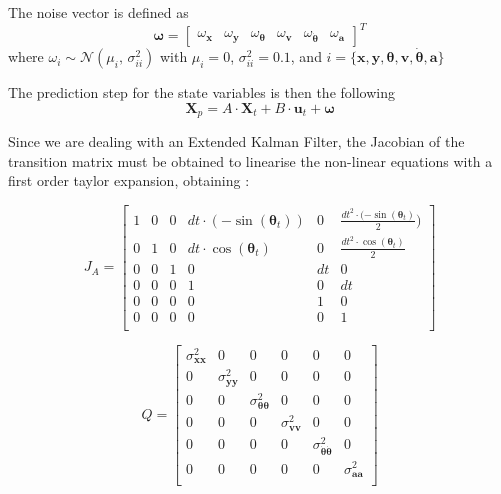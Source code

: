 The noise vector is defined as
\begin{equation}
\boldsymbol \omega
=
\begin{bmatrix} 
\omega_{\mathbf{x}}  & 
\omega_{\mathbf{y}} &
\omega_{\boldsymbol \theta}  & 
\omega_{\mathbf{v}} & 
\omega_{\dot{\boldsymbol \theta}} &
\omega_{\mathbf{a}}
\end{bmatrix} ^T
\end{equation}
where $\omega_i \sim \mathcal{N}(\mu_i,\,\sigma_{ii}^{2})$ with $\mu_i = 0$, $\sigma_{ii}^2 = 0.1$, and $ i = \{ \mathbf{x} , \mathbf{y} , \boldsymbol \theta , \mathbf{v} , \mathbf{\dot{\boldsymbol \theta}} , \mathbf{a} \}$

The prediction step for the state variables is then the following
\begin{equation}
\mathbf{X}_{p} = A \cdot \mathbf{X}_t + B \cdot \mathbf{u}_t + \boldsymbol \omega
\end{equation}

Since we are dealing with an Extended Kalman Filter, the Jacobian of the transition matrix must be obtained to linearise the non-linear equations with a first order taylor expansion, obtaining :

\begin{equation}
J_A
=
\begin{bmatrix} 
1 & 0 & 0 & dt \cdot ( - \sin(\boldsymbol \theta_t)) & 0 & \frac{dt^2 \cdot ( - \sin(\boldsymbol \theta_t)}{2}) \\ 
0 & 1 & 0 & dt \cdot \cos(\boldsymbol \theta_t)& 0 & \frac{dt^2 \cdot \cos(\boldsymbol \theta_t)}{2} \\ 
0 & 0 & 1  & 0 & dt & 0 \\
0 & 0 & 0 & 1 & 0 & dt \\ 
0 & 0 & 0 & 0 & 1 & 0 \\ 
0 & 0 & 0 & 0 & 0 & 1 \\[0.3em]
\end{bmatrix}
\end{equation}

\begin{equation}
Q
=
\begin{bmatrix} 
\sigma_{\mathbf{xx}}^2 & 0 & 0 & 0 & 0 & 0 \\ 
0 & \sigma_{\mathbf{yy}}^2 & 0 & 0 & 0 & 0 \\ 
0 & 0 & \sigma_{\mathbf{\boldsymbol \theta \boldsymbol \theta}}^2 & 0 & 0 & 0 \\ 
0 & 0 & 0 & \sigma_{\mathbf{vv}}^2 & 0 & 0 \\ 
0 & 0 & 0 & 0 & \sigma_{\mathbf{\dot{\boldsymbol \theta}\dot{\boldsymbol \theta}}}^2 & 0 \\ 
0 & 0 & 0 & 0 & 0 & \sigma_{\mathbf{aa}}^2 \\ 
\end{bmatrix}
\end{equation}

